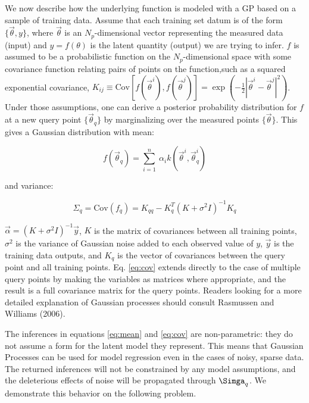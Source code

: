 \documentclass[useAMS,usenatbib,tightenlines,11pt,preprint]{aastex}
\begin{document}
We now describe how the underlying function is modeled with a GP based on a
sample of training data.  Assume that each training set datum is of the
form $\{\vec{\theta},y\}$, where $\vec{\theta}$ is an $N_p$-dimensional
vector representing the measured data (input) and $y = f(\theta)$ is the
latent quantity (output) we are trying to infer.  $f$ is assumed to be a
probabilistic function on the $N_p$-dimensional space with some covariance
function relating pairs of points on the function,such as a squared
exponential covariance,
$K_{ij}\equiv\text{Cov}\left[f(\vec{\theta}^{i}),f(\vec{\theta}^{j})\right]
= \exp(-\frac{1}{2}|\vec{\theta}^{i} - \vec{\theta}^{j}|^2)$.  Under those
assumptions, one can derive a posterior probability distribution for $f$
at a new query point $\{\vec{\theta}_{q}\}$ by marginalizing over
the measured points $\{\vec{\theta}\}$.  This gives a Gaussian distribution
with mean:

\begin{equation}
f(\vec{\theta}_{q}) = \sum_{i=1}^n \
\alpha_i k(\vec{\theta}^{i},\vec{\theta}_{q}^{i})
\label{eq:mean}
\end{equation}

\noindent
and variance:

\begin{equation}
\Sigma_{q} = \text{Cov}(f_{q}) = K_{qq} - K_q^T (K + \sigma^2I)^{-1} K_q
\label{eq:cov}
\end{equation}

\noindent
$\vec{\alpha} = (K + \sigma^2 I)^{-1}\vec{y}$, $K$ is the matrix of
covariances between all training points, $\sigma^2$ is the variance of
Gaussian noise added to each observed value of $y$, $\vec{y}$
is the training data outputs, and
$K_q$ is the vector of covariances between the query point and all
training points.  Eq. \ref{eq:cov} extends directly to the case of multiple
query points by making the variables as matrices where appropriate, and the
result is a full covariance matrix for the query points.  Readers looking
for a more detailed explanation of Gaussian processes should consult
Rasmussen and Williams (2006).

The inferences in equations \ref{eq:mean} and \ref{eq:cov} are non-parametric:
they do not assume a form for the latent model they represent.  This means that
Gaussian Processes can be used for model regression even in the cases of noisy,
sparse data.  The returned inferences will not be constrained by any model
assumptions, and the deleterious effects of noise will be propagated through
$\Simga_q$.  We demonstrate this behavior on the following problem.
\end{document}
